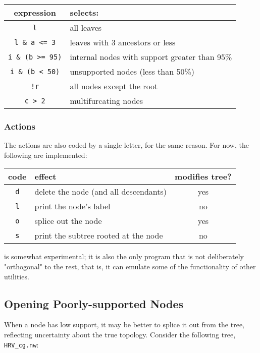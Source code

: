 \begin{center}
\begin{tabular}{cl}
expression & selects: \\
\hline
\texttt{l} & all leaves \\
\texttt{l \& a <= 3} & leaves with 3 ancestors or less \\
\texttt{i \& (b >= 95)} & internal nodes with support greater than 95\% \\ 
\texttt{i \& (b < 50)} & unsupported nodes (less than 50\%) \\
\texttt{!r} & all nodes except the root \\
\texttt{c > 2} & multifurcating nodes
\end{tabular}
\end{center}

\subsubsection{Actions}

The actions are also coded by a single letter, for the same reason. For now,
the following are implemented:

\begin{center}
\begin{tabular}{clc}
code & effect & modifies tree?\\
\hline
\texttt{d} & delete the node (and all descendants) & yes \\
\texttt{l} & print the node's label & no \\
\texttt{o} & splice out the node & yes \\
\texttt{s} & print the subtree rooted at the node & no \\
\end{tabular}
\end{center}

\ed{} is somewhat experimental; it is also the only program that is not
deliberately "orthogonal" to the rest, that is, it can emulate some of the
functionality of other utilities.

\subsection{Opening Poorly-supported Nodes}
\label{sct:ed_ed}

When a node has low support, it may be better to splice it out from the tree,
reflecting uncertainty about the true topology. Consider the following tree, 
\texttt{HRV\_cg.nw}:

